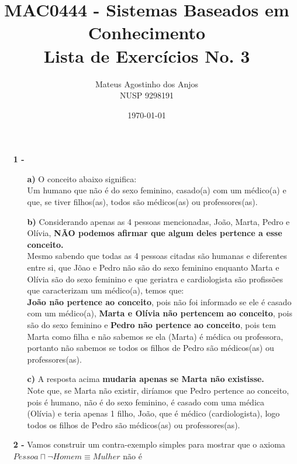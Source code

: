 \documentclass[12pt]{article}
\title{MAC0444 - Sistemas Baseados em Conhecimento \\
Lista de Exercícios No. 3
}
\author{Mateus Agostinho dos Anjos\\NUSP 9298191}
\date{\today}
\begin{document}
	\maketitle
	\begin{itemize}
		\item[\textbf{1 -}]
			\hfill\newline
			\begin{itemize}
				\item[\textbf{a) }]
					\hfill\newline
					O conceito abaixo significa:\\
					Um humano que não é do sexo feminino, casado(a) com um médico(a) e que,
					se tiver filhos(as), todos são médicos(as) ou professores(as). 
				\item[\textbf{b) }]
					\hfill\newline
					Considerando apenas as 4 pessoas mencionadas, João, Marta, Pedro
					e Olívia, \textbf{NÃO podemos afirmar que algum deles pertence a esse conceito.}\\
					Mesmo sabendo que todas as 4 pessoas citadas são humanas e diferentes entre si,
					que Jõao e Pedro não são do sexo feminino enquanto Marta e Olívia são do sexo feminino
					e que geriatra e cardiologista são profissões que caracterizam um médico(a),
					temos que:\\ 
					\textbf{João não pertence ao conceito}, pois não foi informado se ele é casado com
					um médico(a), \textbf{Marta e Olívia não pertencem ao conceito}, pois são do sexo
					feminino e \textbf{Pedro não pertence ao conceito}, pois tem Marta como filha e não
					sabemos se ela (Marta) é médica ou professora,
					portanto não sabemos se todos os filhos de Pedro são médicos(as) ou professores(as).
					\newpage
				\item[\textbf{c) }]
					\hfill\newline
					A resposta acima \textbf{mudaria apenas se Marta não existisse.}\\
					Note que, se Marta não existir, diríamos que Pedro pertence ao conceito, 
					pois é humano, não é do sexo feminino, é casado com uma médica (Olívia) e
					teria apenas 1 filho, João, que é médico (cardiologista), logo todos os filhos
					de Pedro são médicos(as) ou professores(as).
			\end{itemize}
		\item[\textbf{2 -}]
			\hfill\newline
			Vamos construir um contra-exemplo simples para mostrar que o
			axioma $Pessoa \sqcap \neg Homem \equiv Mulher$ não é

\end{itemize}
\end{document}
